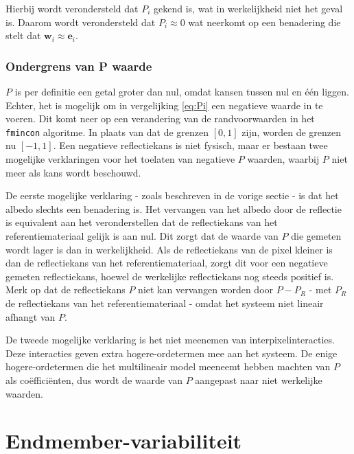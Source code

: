 \documentclass[12pt]{report}
\begin{document}
Hierbij wordt verondersteld dat $P_i$ gekend is, wat in werkelijkheid niet het geval is. Daarom wordt verondersteld dat $P_i \approx 0$ wat neerkomt op een benadering die stelt dat $\bm{w}_i \approx \bm{e}_i$. 

\subsection{Ondergrens van P waarde}

$P$ is per definitie een getal groter dan nul, omdat kansen tussen nul en \'e\'en liggen. Echter, het is mogelijk om in vergelijking \ref{eq:Pi} een negatieve waarde in te voeren. Dit komt neer op een verandering van de randvoorwaarden in het \texttt{fmincon} algoritme. In plaats van dat de grenzen $[0,1]$ zijn, worden de grenzen nu $[-1,1]$. 
Een negatieve reflectiekans is niet fysisch, maar er bestaan twee mogelijke verklaringen voor het toelaten van negatieve $P$ waarden, waarbij $P$ niet meer als kans wordt beschouwd.

De eerste mogelijke verklaring - zoals beschreven in de vorige sectie - is dat het albedo slechts een benadering is. Het vervangen van het albedo door de reflectie is equivalent aan het veronderstellen dat de reflectiekans van het referentiemateriaal gelijk is aan nul. Dit zorgt dat de waarde van $P$ die gemeten wordt lager is dan in werkelijkheid. Als de reflectiekans van de pixel kleiner is dan de reflectiekans van het referentiemateriaal, zorgt dit voor een negatieve gemeten reflectiekans, hoewel de werkelijke reflectiekans nog steeds positief is. Merk op dat de reflectiekans $P$ niet kan  vervangen worden door $P-P_{R}$  - met $P_{R}$ de reflectiekans van het referentiemateriaal - omdat het systeem niet lineair afhangt van $P$.

De tweede mogelijke verklaring is het niet meenemen van interpixelinteracties. Deze interacties geven extra hogere-ordetermen mee aan het systeem. De enige hogere-ordetermen die het multilineair model meeneemt hebben machten van $P$ als co\"effici\"enten, dus wordt de waarde van $P$ aangepast naar niet werkelijke waarden.  



\chapter{Endmember-variabiliteit\cite{mesma}} 
\end{document}
